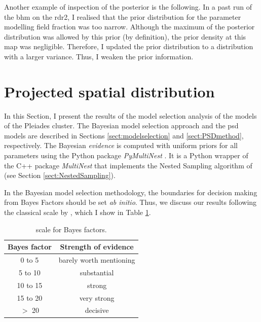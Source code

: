 Another example of inspection of the posterior is the following. In a past run of the \gls{bhm} on the \gls{rdr2}, I realised that the prior distribution for the parameter modelling field fraction was too narrow. Although the maximum of the posterior distribution was allowed by this prior (by definition), the prior density at this \gls{map} was negligible. Therefore, I updated the prior distribution to a distribution with a larger variance. Thus, I weaken the prior information.

\section{Projected spatial distribution}
\label{sect:PSDresults}
In this Section, I present the results of the model selection analysis of the  models of the Pleiades cluster. The Bayesian model selection approach and the \gls{psd} models are described in Sections \ref{sect:modelselection} and \ref{sect:PSDmethod}, respectively. The Bayesian \emph{evidence} is computed with uniform priors for all parameters using the Python package \emph{PyMultiNest} \citep{Buchner2014}. It is a Python wrapper of the C++ package \emph{MultiNest} \citep{Feroz2009} that implements the Nested Sampling algorithm of \citet{Skilling2004,Skilling2006} (see Section \ref{sect:NestedSampling}).

In the Bayesian model selection methodology, the boundaries for decision making from Bayes Factors should be set \emph{ab initio}. Thus, we discuss our results following the classical scale by \cite{Jeffreys61}, which I show in Table \ref{tab:JeffreysScale}.

\begin{table}[H]
\caption{\citet{Jeffreys61} scale for Bayes factors.}
\begin{center}
\begin{tabular}{cc}
Bayes factor & Strength of evidence\\
\hline
0 to 5 & barely worth mentioning\\
5 to 10 & substantial\\
10 to 15 & strong\\
15 to 20 & very strong\\
$>$ 20 & decisive\\
\hline
\end{tabular}
\end{center}
\label{tab:JeffreysScale}
\end{table}%
 


